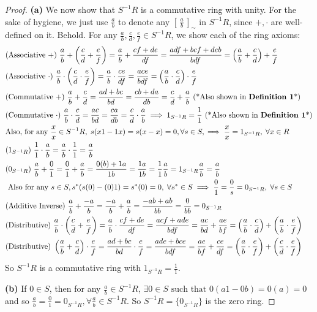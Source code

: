 \documentclass[addpoints,10pt]{exam}
\theoremstyle{plain}
\theoremstyle{definition}
\theoremstyle{plain}
\theoremstyle{plain}
\theoremstyle{definition}
\newcommand{\class}[2][]{\ensuremath{\left[\,#2\,\right]_{#1}}}
\begin{document}
\begin{proof}
    \textbf{(a)} We now show that $S^{-1}R$ is a commutative ring with unity. For the sake of hygiene, we just use $\frac{a}{b}$ to denote any $\class[\sim]{\frac{a}{b}}$ in $S^{-1}R$, since $+,\cdot$ are well-defined on it. Behold. For any $\frac{a}{b},\frac{c}{d},\frac{e}{f}\in S^{-1}R$, we show each of the ring axioms:
    \begin{align*}
        &\text{(Associative $+$) } \frac{a}{b}+\left(\frac{c}{d}+\frac{e}{f}\right)=\frac{a}{b}+\frac{cf+de}{df}=\frac{adf+bcf+deb}{bdf}=\left(\frac{a}{b}+\frac{c}{d}\right)+\frac{e}{f}\\
        &\text{(Associative $\cdot$) } \frac{a}{b}\cdot \left(\frac{c}{d}\cdot \frac{e}{f}\right)=\frac{a}{b}\cdot \frac{ce}{df}=\frac{ace}{bdf}=\left(\frac{a}{b}\cdot \frac{c}{d}\right)\cdot \frac{e}{f}\\
        &\text{(Commutative $+$) } \frac{a}{b}+\frac{c}{d}=\frac{ad+bc}{bd}=\frac{cb+da}{db}=\frac{c}{d}+\frac{a}{b}\text{ (*Also shown in \textbf{Definition 1}*)}\\
        &\text{(Commutative $\cdot$) } \frac{a}{b}\cdot \frac{c}{d}=\frac{ac}{bd}=\frac{ca}{db}=\frac{c}{d}\cdot \frac{a}{b}\implies 1_{S^{-1}R}=\frac{1}{1} \text{ (*Also shown in \textbf{Definition 1}*)}\\
        &\text{Also, for any }\frac{x}{x}\in S^{-1}R,\; s(x1-1x)=s(x-x)=0,\forall s\in S,\implies \frac{x}{x}=1_{S^{-1}R},\;\forall x\in R\\
        &\text{($1_{S^{-1}R}$) }\frac{1}{1}\cdot\frac{a}{b}=\frac{a}{b}\cdot\frac{1}{1}=\frac{a}{b}\\
        &\text{($0_{S^{-1}R}$) } \frac{a}{b}+\frac{0}{1}=\frac{0}{1}+\frac{a}{b}=\frac{0(b)+1a}{1b}=\frac{1a}{1b}=\frac{1}{1}\frac{a}{b}=1_{S^{-1}R}\frac{a}{b}=\frac{a}{b}\\
        &\text{ Also for any }s\in S, s^{*}(s(0)-(0)1)=s^{*}(0)=0,\;\forall s^{*}\in S\implies \frac{0}{1}=\frac{0}{s}=0_{S^{-1}R},\;\forall s\in S\\
        &\text{(Additive Inverse) } \frac{a}{b}+\frac{-a}{b}=\frac{-a}{b}+\frac{a}{b}=\frac{-ab+ab}{bb}=\frac{0}{bb}=0_{S^{-1}R}\\
        &\text{(Distributive) } \frac{a}{b}\cdot \left(\frac{c}{d}+\frac{e}{f}\right)=\frac{a}{b}\cdot \frac{cf+de}{df}=\frac{acf+ade}{bdf}=\frac{ac}{bd}+\frac{ae}{bf}=\left(\frac{a}{b}\cdot \frac{c}{d}\right)+\left(\frac{a}{b}\cdot \frac{e}{f}\right)\\
        &\text{(Distributive) } \left(\frac{a}{b}+\frac{c}{d}\right)\cdot \frac{e}{f}=\frac{ad+bc}{bd}\cdot \frac{e}{f}=\frac{ade+bce}{bdf}=\frac{ae}{bf}+\frac{ce}{df}=\left(\frac{a}{b}\cdot \frac{e}{f}\right)+\left(\frac{c}{d}\cdot \frac{e}{f}\right)
    \end{align*}
    So $S^{-1}R$ is a commutative ring with $1_{S^{-1}R}=\frac{1}{1}$.

    \textbf{(b)} If $0\in S$, then for any $\frac{a}{b}\in S^{-1}R$, $\exists 0\in S\text{ such that }0(a1-0b)=0(a)=0$ and so $\frac{a}{b}=\frac{0}{1}=0_{S^{-1}R},\forall \frac{a}{b}\in S^{-1}R$. So $S^{-1}R=\{0_{S^{-1}R}\}$ is the zero ring.

\end{proof}
\end{document}

